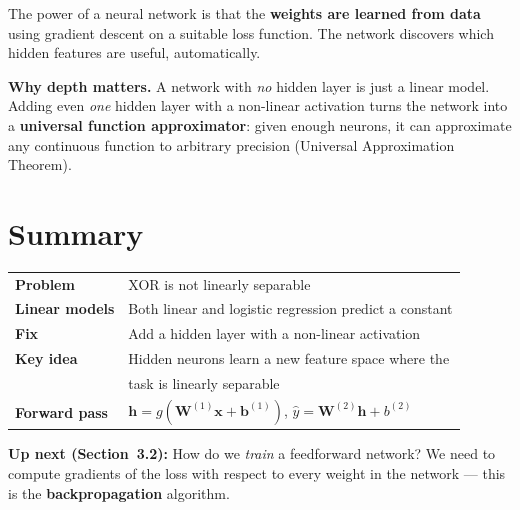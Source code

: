 \documentclass[12pt, a4paper]{article}
\theoremstyle{definition}
\newcommand{\bx}{\mathbf{x}}
\newcommand{\bW}{\mathbf{W}}
\newcommand{\bb}{\mathbf{b}}
\newcommand{\bh}{\mathbf{h}}
\newcommand{\yhat}{\hat{y}}
\begin{document}
The power of a neural network is that the \textbf{weights are learned from
data} using gradient descent on a suitable loss function.  The network
discovers which hidden features are useful, automatically.

\begin{notebox}
\textbf{Why depth matters.}
A network with \emph{no} hidden layer is just a linear model.  Adding even
\emph{one} hidden layer with a non-linear activation turns the network into a
\textbf{universal function approximator}: given enough neurons, it can
approximate any continuous function to arbitrary precision (Universal
Approximation Theorem).
\end{notebox}

\section{Summary}

\begin{center}
\renewcommand{\arraystretch}{1.5}
\begin{tabular}{ll}
\toprule
\textbf{Problem}          & XOR is not linearly separable \\
\textbf{Linear models}    & Both linear and logistic regression predict a constant \\
\textbf{Fix}              & Add a hidden layer with a non-linear activation \\
\textbf{Key idea}         & Hidden neurons learn a new feature space where the \\
                          & task is linearly separable \\
\textbf{Forward pass}     & $\bh = g(\bW^{(1)}\bx + \bb^{(1)})$,\;
                            $\yhat = \bW^{(2)}\bh + b^{(2)}$ \\
\bottomrule
\end{tabular}
\end{center}

\bigskip
\textbf{Up next (Section~3.2):} How do we \emph{train} a feedforward network?
We need to compute gradients of the loss with respect to every weight in the
network — this is the \textbf{backpropagation} algorithm.
\end{document}
